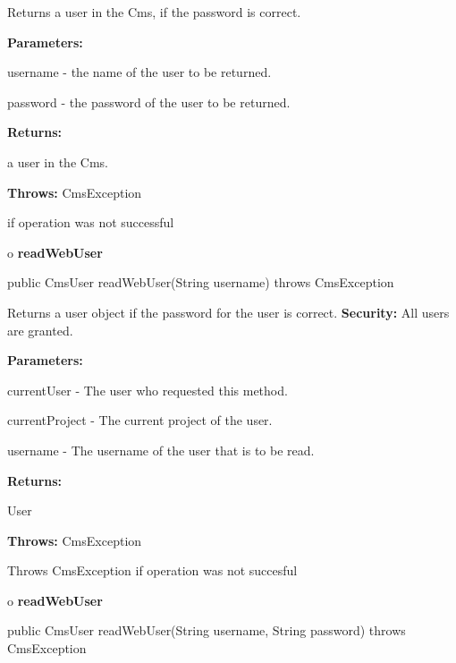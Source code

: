 \begin{description}
\htmlDD Returns a user in the Cms, if the password is correct. 

\begin{description}
\item {\bf Parameters:}  

username - the name of the user to be returned.  

password - the password of the user to be returned.  
\item {\bf Returns:}  

a user in the Cms.  
\item {\bf Throws:} CmsException  

if operation was not successful  
\end{description}

\end{description}

o {\bf readWebUser} 

\begin{PRE}
 public CmsUser readWebUser(String username) throws CmsException
\end{PRE}

\begin{description}
\htmlDD Returns a user object if the password for the user is correct. {\bf
Security:} All users are granted. 

\begin{description}
\item {\bf Parameters:}  

currentUser - The user who requested this method.  

currentProject - The current project of the user.  

username - The username of the user that is to be read.  
\item {\bf Returns:}  

User  
\item {\bf Throws:} CmsException  

Throws CmsException if operation was not succesful  
\end{description}

\end{description}

o {\bf readWebUser} 

\begin{PRE}
 public CmsUser readWebUser(String username,
                            String password) throws CmsException
\end{PRE}

